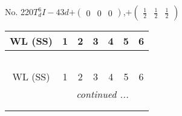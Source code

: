 \documentclass[fleqn,9pt,landscape]{jsarticle}
\begin{document}
\newpage
No. 220\quad$T_{d}^{6}$\quad$I-43d$\quad[ cubic ]\quad$+\begin{pmatrix} 0 & 0 & 0 \end{pmatrix}$,\quad $+\begin{pmatrix} \frac{1}{2} & \frac{1}{2} & \frac{1}{2} \end{pmatrix}$
\begin{center}
\renewcommand{\arraystretch}{1.2}
\begin{longtable}{ccccccc}
 \hline \hline
WL (SS) & 1 & 2 & 3 & 4 & 5 & 6 \\ \hline \endfirsthead

\multicolumn{6}{l}{\tablename\ \thetable{}} \\
 \hline \hline
WL (SS) & 1 & 2 & 3 & 4 & 5 & 6 \\ \hline \endhead

 \hline \hline
\multicolumn{6}{r}{\footnotesize\it continued ...} \\ \endfoot

 \hline \hline
\multicolumn{6}{r}{} \\ \endlastfoot


\end{longtable}
\end{center}
\end{document}
